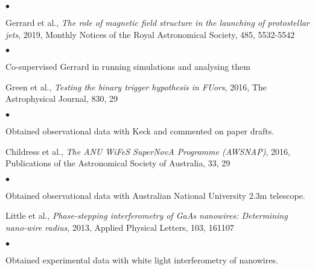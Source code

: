 \documentclass[margin,line]{res}
\newenvironment{list1}{
	\begin{list}{\ding{113}}{%
			\setlength{\itemsep}{0in}
			\setlength{\parsep}{0in} \setlength{\parskip}{0in}
			\setlength{\topsep}{0in} \setlength{\partopsep}{0in} 
			\setlength{\leftmargin}{0.17in}}}{\end{list}}
\newenvironment{list2}{
	\begin{list}{$\bullet$}{%
			\setlength{\itemsep}{0in}
			\setlength{\parsep}{0in} \setlength{\parskip}{0in}
			\setlength{\topsep}{0in} \setlength{\partopsep}{0in} 
			\setlength{\leftmargin}{0.2in}}}{\end{list}}
\begin{document}
\begin{resume}
\begin{list1}
\begin{list2}
	\end{list2}
	\item[] Gerrard et al., \emph{The role of magnetic field structure in the launching of protostellar jets}, 2019, Monthly Notices of the Royal Astronomical Society, 485, 5532-5542
	\begin{list2}
		\item Co-supervised Gerrard in running simulations and analysing them\\
	\end{list2}
	\item[] Green et al., \emph{Testing the binary trigger hypothesis in FUors}, 2016, The Astrophysical Journal, 830, 29
	\begin{list2}
		\item Obtained observational data with Keck and commented on paper drafts.\\
	\end{list2}
	\item[] Childress et al., \emph{The ANU WiFeS SuperNovA Programme (AWSNAP)}, 2016, Publications of the Astronomical Society of Australia, 33, 29
	\begin{list2}
		\item Obtained observational data with Australian National University 2.3m telescope.\\
	\end{list2}
	\item[] Little et al., \emph{Phase-stepping interferometry of GaAs nanowires: Determining nano-wire radius}, 2013, Applied Physical Letters, 103, 161107
	\begin{list2}
		\item Obtained experimental data with white light interferometry of nanowires.\\
	\end{list2}
\end{list1}
		
		
		

\end{resume}
\end{document}
